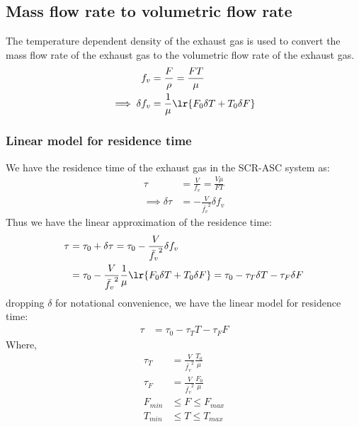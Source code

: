 \subsection{Mass flow rate to volumetric flow rate}
The temperature dependent density of the exhaust gas is used to convert the mass
flow rate of the exhaust gas to the volumetric flow rate of the exhaust gas.
\begin{align}
    f_v &= \frac{F}{\rho} = \frac{FT}{\mu}\\
    \implies \delta f_v &= \frac{1}{\mu} \lr{F_0 \delta T + T_0 \delta F}   \label{eqn::fv_approx}
\end{align}


\subsubsection{Linear model for residence time}
We have the residence time of the exhaust gas in the SCR-ASC system as:
\begin{align*}
    \tau &= \frac{V}{f_v} = \frac{V \mu}{FT} \\
    \implies
    \delta \tau &= - \frac{V}{\bar{f_v} ^2} \delta f_v
\end{align*}
Thus we have the linear approximation of the residence time:
\begin{align*}
    \tau &= \tau_0 + \delta \tau
          = \tau_0 - \frac{V}{\bar{f_v} ^2} \delta f_v\\
         &= \tau_0 - \frac{V}{\bar{f_v} ^2}  \frac{1}{\mu} \lr{F_0 \delta T + T_0 \delta F}
          = \tau_0 - \tau_T \delta T - \tau_F \delta F
\end{align*}
dropping $\delta$ for notational convenience, we have the linear model for residence time:
\begin{align}
    \tau &= \tau_0 - \tau_T T - \tau_F F        \label{eqn::res_time}
\end{align}
Where,
\begin{align*}
    \tau_T &= \frac{V}{\bar{f_v} ^2}  \frac{T_0}{\mu}\\
    \tau_F &= \frac{V}{\bar{f_v} ^2}  \frac{F_0}{\mu}\\
    F_{min} &\leq F \leq F_{max}\\
    T_{min} &\leq T \leq T_{max}
\end{align*}
